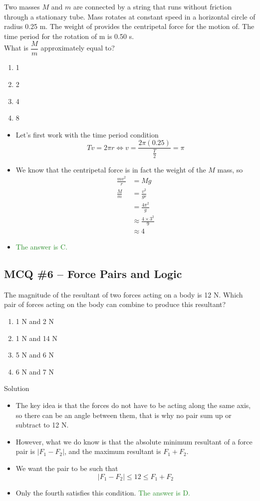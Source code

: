 \documentclass[a4paper,12pt]{article}
\newcommand{\lb}{\\[8pt]}
\newcommand{\ans}[1]{\textcolor{ForestGreen}{The answer is #1.}}
\begin{document}
Two masses $M$ and $m$ are connected by a string that runs without friction through a stationary tube. Mass rotates at constant speed in a horizontal circle of radius 0.25 m. The weight of provides the centripetal force for the motion of. The time period for the rotation of m is 0.50 s.\lb
What is $\dfrac{M}{m}$ approximately equal to?

\begin{enumerate}[label=\Alph*.]
  \item 1
  \item 2
  \item 4
  \item 8
\end{enumerate}

\begin{itemize}
  \item Let's first work with the time period condition
        $$Tv = 2\pi r \iff v = \frac{2\pi (0.25)}{\frac{T}{2}} = \pi$$
  \item We know that the centripetal force is in fact the weight of the $M$ mass, so
        \begin{align*}
          \frac{mv^2}{r} & = Mg                          \\
          \frac{M}{m}    & = \frac{v^2}{g r}             \\
                         & = \frac{4\pi^2}{g}            \\
                         & \approx \frac{4\times 3^2}{9} \\
                         & \approx 4
        \end{align*}
  \item \ans{C}
\end{itemize}

\subsection{MCQ \#6 -- Force Pairs and Logic}

The magnitude of the resultant of two forces acting on a body is 12 N. Which pair of forces acting on the body can combine to produce this resultant?
\begin{enumerate}[label=\Alph*.]
  \item 1 N and 2 N
  \item 1 N and 14 N
  \item 5 N and 6 N
  \item 6 N and 7 N
\end{enumerate}
Solution
\begin{itemize}
  \item The key idea is that the forces do not have to be acting along the same axis, so there can be an angle between them, that is why no pair sum up or subtract to 12 N.
  \item However, what we do know is that the absolute minimum resultant of a force pair is $|F_1 - F_2|$, and the maximum resultant is $F_1 + F_2$.
  \item We want the pair to be such that
        $$|F_1 - F_2| \le 12 \le F_1 + F_2$$
  \item Only the fourth satisfies this condition. \ans{D}
\end{itemize}
\end{document}
